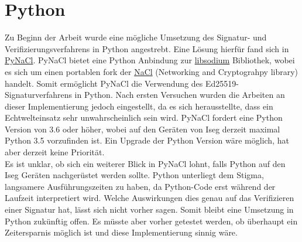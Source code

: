 \documentclass[thesis=bachelor,faculty=cb]{hsmw-thesis}
\begin{document}
\section{Python}
Zu Beginn der Arbeit wurde eine mögliche Umsetzung des Signatur- und Verifizierungsverfahrens in Python angestrebt. Eine Lösung hierfür fand sich in {\href{https://pypi.org/project/PyNaCl/}{PyNaCl}. PyNaCl bietet eine Python Anbindung zur \href{https://github.com/jedisct1/libsodium}{libsodium} Bibliothek, wobei es sich um einen portablen fork der \href{https://nacl.cr.yp.to/}{NaCl} (Networking and Cryptograhpy library) handelt. Somit ermöglicht PyNaCl die Verwendung des Ed25519-Signaturverfahrens in Python. Nach ersten Versuchen wurden die Arbeiten an dieser Implementierung jedoch eingestellt, da es sich herausstellte, dass ein Echtwelteinsatz sehr unwahrscheinlich sein wird. PyNaCl fordert eine Python Version von 3.6 oder höher, wobei auf den Geräten von Iseg derzeit maximal Python 3.5 vorzufinden ist. Ein Upgrade der Python Version wäre möglich, hat aber derzeit keine Priorität. 
	\\[1cm]
	Es ist unklar, ob sich ein weiterer Blick in PyNaCl lohnt, falls Python auf den Iseg Geräten nachgerüstet werden sollte. Python unterliegt dem Stigma, langsamere Ausführungszeiten zu haben, da Python-Code erst während der Laufzeit interpretiert wird. Welche Auswirkungen dies genau auf das Verifizieren einer Signatur hat, lässt sich nicht vorher sagen. Somit bleibt eine Umsetzung in Python zukünftig offen. Es müsste aber vorher getestet werden, ob überhaupt ein Zeitersparnis möglich ist und diese Implementierung sinnig wäre.
}
\end{document}

